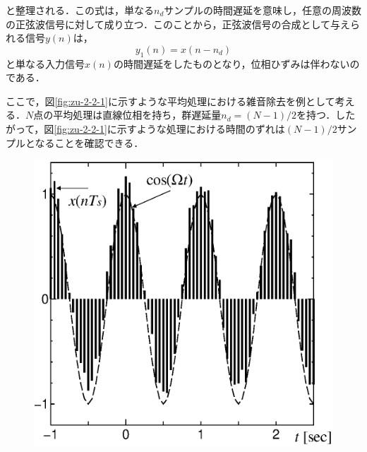 \noindent と整理される．この式は，単なる$n_d$サンプルの時間遅延を意味し，任意の周波数の正弦波信号に対して成り立つ．このことから，正弦波信号の合成として与えられる信号$y(n)$は，
\begin{equation}
y_1(n)=x ( n - n_d)
\label{eqn:eqn-6-7}
\end{equation}
と単なる入力信号$x(n)$の時間遅延をしたものとなり，位相ひずみは伴わないのである．

ここで，図\ref{fig:zu-2-2-1}に示すような平均処理における雑音除去を例として考える．$N$点の平均処理は直線位相を持ち，群遅延量$n_d = (N-1)/2$を持つ．したがって，図\ref{fig:zu-2-2-1}に示すような処理における時間のずれは$(N-1)/2$サンプルとなることを確認できる．

\begin{figure}[H]
\begin{center}
\begin{minipage}{.4\textwidth}
\begin{center}
\includegraphics[width=.98\textwidth]{fig/zu-2-2-a.eps}


\end{center}
\end{minipage}
\end{center}
\end{figure}
